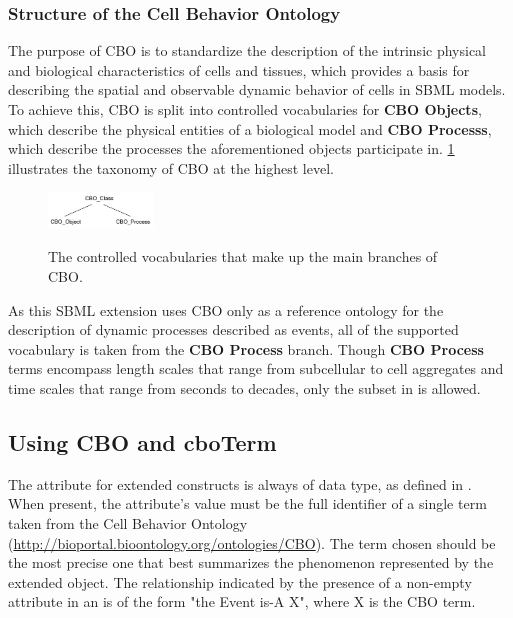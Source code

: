 \subsubsection{Structure of the Cell Behavior Ontology}
\label{subsec:CBOstructure}

The purpose of CBO is to standardize the description of the intrinsic physical and biological characteristics of cells and tissues, which provides a basis for describing the spatial and observable dynamic behavior of cells in SBML models. To achieve this, CBO is split into controlled vocabularies for \textbf{CBO \textunderscore Objects}, which describe the physical entities of a biological model and \textbf{CBO \textunderscore Processs}, which describe the processes the aforementioned objects participate in. \ref{fig:CBOHierarchy} illustrates the taxonomy of CBO at the highest level.


\begin{figure}[tbhp]
	\centering
	\includegraphics[width=0.25\textwidth]{images/CBO_Hierarchy.pdf}\\
	\caption{The controlled vocabularies that make up the main branches of CBO.} \label{fig:CBOHierarchy}
\end{figure}

As this SBML extension uses CBO only as a reference ontology for the description of dynamic processes described as events, all of the supported vocabulary is taken from the \textbf{CBO \textunderscore Process} branch. Though \textbf{CBO \textunderscore Process} terms encompass length scales that range from subcellular to cell aggregates and time scales that range from seconds to decades, only the subset in  is allowed.

\subsection{Using CBO and cboTerm}
\label{subsec:CBOTerm&CBO}

The  attribute for extended \Event constructs is always of  data type, as defined in . When present, the attribute's value must be the full identifier of a single term taken from the Cell Behavior Ontology (\url{http://bioportal.bioontology.org/ontologies/CBO}). The term chosen should be the most precise one that best summarizes the phenomenon represented by the extended \Event object. The relationship indicated by the presence of a non-empty  attribute in an \Event is of the form "the Event is-A X", where X is the CBO term. 

